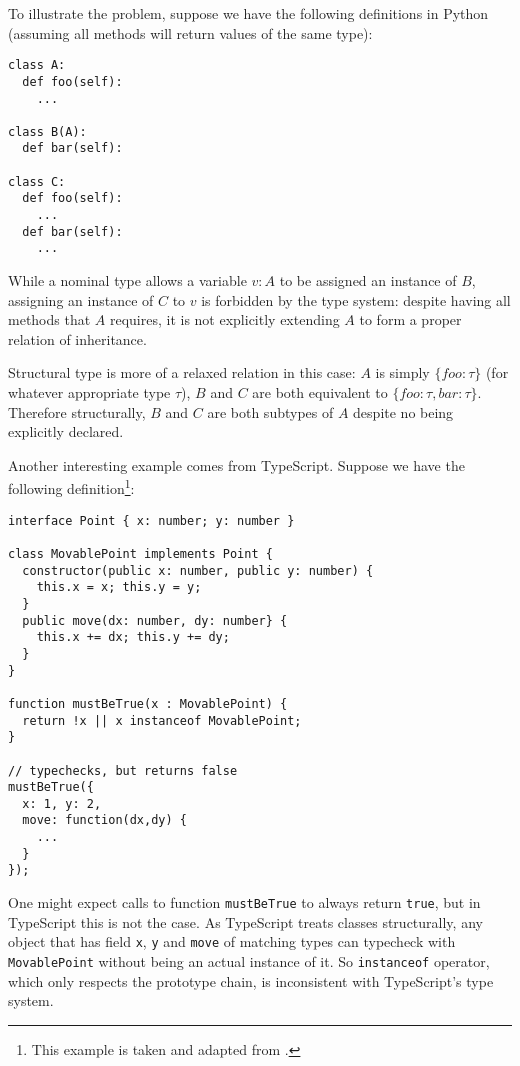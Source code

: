 To illustrate the problem, suppose we have the following definitions in Python
(assuming all methods will return values of the same type):

\begin{verbatim}
class A:
  def foo(self):
    ...

class B(A):
  def bar(self):

class C:
  def foo(self):
    ...
  def bar(self):
    ...
\end{verbatim}

While a nominal type allows a variable $v : A$ to be assigned an instance of $B$,
assigning an instance of $C$ to $v$ is forbidden by the type system: despite
having all methods that $A$ requires, it is not explicitly extending $A$ to form a proper relation of
inheritance.

Structural type is more of a relaxed relation in this case: $A$ is simply $\{foo: \tau \}$ (for whatever appropriate type $\tau$), $B$ and $C$ are both equivalent to $\{foo: \tau, bar: \tau\}$. Therefore structurally, $B$ and $C$ are both subtypes of $A$ despite no being explicitly declared.

Another interesting example comes from TypeScript.
Suppose we have the following definition\footnote{This example is taken and adapted from \cite{rastogi2015safe}.}:

\begin{verbatim}
interface Point { x: number; y: number }

class MovablePoint implements Point {
  constructor(public x: number, public y: number) {
    this.x = x; this.y = y;
  }
  public move(dx: number, dy: number} {
    this.x += dx; this.y += dy;
  }
}

function mustBeTrue(x : MovablePoint) {
  return !x || x instanceof MovablePoint;
}

// typechecks, but returns false
mustBeTrue({
  x: 1, y: 2,
  move: function(dx,dy) {
    ...
  }
});
\end{verbatim}

One might expect calls to function \texttt{mustBeTrue} to always return \texttt{true},
but in TypeScript this is not the case.
As TypeScript treats classes structurally, any object that has field \texttt{x}, \texttt{y} and \texttt{move}
of matching types can typecheck with \texttt{MovablePoint} without being an actual instance of it.
So \texttt{instanceof} operator, which only respects the prototype chain,
is inconsistent with TypeScript's type system.

